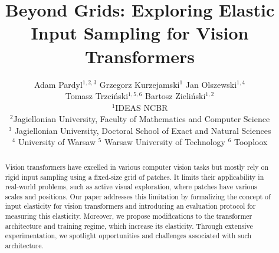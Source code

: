 \documentclass[10pt,twocolumn,letterpaper]{article}
\begin{document}

\title{Beyond Grids: Exploring Elastic Input Sampling for Vision Transformers}

\author{Adam Pardyl$^{1,2,3}$ \qquad Grzegorz Kurzejamski$^{1}$ \qquad Jan Olszewski$^{1,4}$ \\
Tomasz Trzciński$^{1,5,6}$ \qquad Bartosz Zieliński$^{1,2}$ \\
$^1$IDEAS NCBR \\
$^2$Jagiellonian University, Faculty of Mathematics and Computer Science \\
$^3$ Jagiellonian University, Doctoral School of Exact and Natural
Sciences \\
$^4$ University of Warsaw \qquad $^5$ Warsaw University of Technology \qquad $^6$ Tooploox 
}

\maketitle

\begin{abstract}
Vision transformers have excelled in various computer vision tasks but mostly rely on rigid input sampling using a fixed-size grid of patches. It limits their applicability in real-world problems, such as active visual exploration, where patches have various scales and positions.
%
Our paper addresses this limitation by formalizing the concept of input elasticity for vision transformers and introducing an evaluation protocol for measuring this elasticity.
%
Moreover, we propose modifications to the transformer architecture and training regime, which increase its elasticity.
%
Through extensive experimentation, we spotlight opportunities and challenges associated with such architecture.
\end{abstract}
\end{document}

